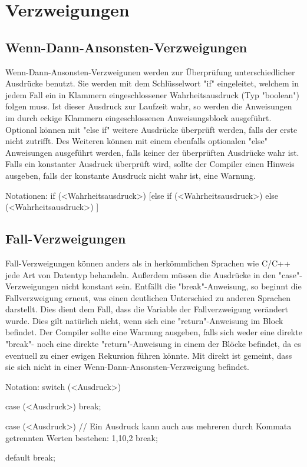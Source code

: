 \chapter{Verzweigungen}

\section{Wenn-Dann-Ansonsten-Verzweigungen}
Wenn-Dann-Ansonsten-Verzweigunen werden zur Überprüfung unterschiedlicher Ausdrücke benutzt.
Sie werden mit dem Schlüsselwort "if" eingeleitet, welchem in jedem Fall ein in Klammern eingeschlossener Wahrheitsausdruck (Typ "boolean")
folgen muss. Ist dieser Ausdruck zur Laufzeit wahr, so werden die Anweisungen im durch eckige Klammern eingeschlossenen Anweisungsblock
ausgeführt.
Optional können mit "else if" weitere Ausdrücke überprüft werden, falls der erste nicht zutrifft. Des Weiteren können mit einem ebenfalls optionalen
"else" Anweisungen ausgeführt werden, falls keiner der überprüften Ausdrücke wahr ist.
Falls ein konstanter Ausdruck überprüft wird, sollte der Compiler einen Hinweis ausgeben, falls der konstante Ausdruck nicht wahr ist, eine Warnung.

Notationen:
if (<Wahrheitsausdruck>)
{
}
[else if (<Wahrheitsausdruck>)
{
}
else (<Wahrheitsausdruck>)
{
}]

\section{Fall-Verzweigungen}
Fall-Verzweigungen können anders als in herkömmlichen Sprachen wie C/C++ jede Art von Datentyp behandeln. Außerdem müssen die Ausdrücke in den "case"-
Verzweigungen nicht konstant sein.
Entfällt die "break"-Anweisung, so beginnt die Fallverzweigung erneut, was einen deutlichen Unterschied zu anderen Sprachen darstellt.
Dies dient dem Fall, dass die Variable der Fallverzweigung verändert wurde.
Dies gilt natürlich nicht, wenn sich eine "return"-Anweisung im Block befindet.
Der Compiler sollte eine Warnung ausgeben, falls sich weder eine direkte "break"- noch eine direkte "return"-Anweisung in einem der Blöcke befindet, da
es eventuell zu einer ewigen Rekursion führen könnte.
Mit direkt ist gemeint, dass sie sich nicht in einer Wenn-Dann-Ansonsten-Verzweigung befindet.

Notation:
switch (<Ausdruck>)
{
	case (<Ausdruck>)
	{
		break;
	}

	case (<Ausdruck>) // Ein Ausdruck kann auch aus mehreren durch Kommata getrennten Werten bestehen: 1,10,2
	{
		break;
	}

	default
	{
		break;
	}
} 
